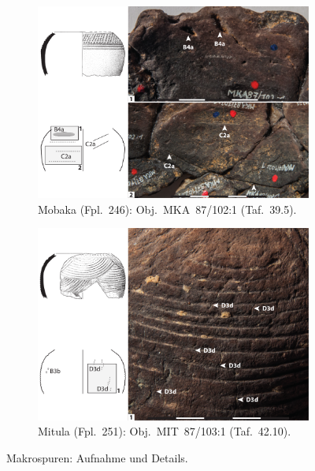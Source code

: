 \begin{multicols}{2}
\begin{figure}[p]
	\centering
	\begin{subfigure}{\textwidth}
		\centering
		\includegraphics[width = \textwidth]{fig/Abb_Macrotraces/MKA87-102-1.pdf}
		\caption{Mobaka (Fpl.~246): Obj.~MKA~87/102:1 (Taf.~39.5).\vspace{1em}}
		\label{MKA87-102-1_Makrospuren}
	\end{subfigure}
	\begin{subfigure}{\textwidth}
		\centering
		\includegraphics[width = \textwidth]{fig/Abb_Macrotraces/MIT87-103-1.pdf}
		\caption{Mitula (Fpl.~251): Obj.~MIT~87/103:1 (Taf.~42.10).}
		\label{MIT87-103-1_Makrospuren}
	\end{subfigure}
	\caption{Makrospuren: Aufnahme und Details.}
\end{figure}


\end{multicols}
